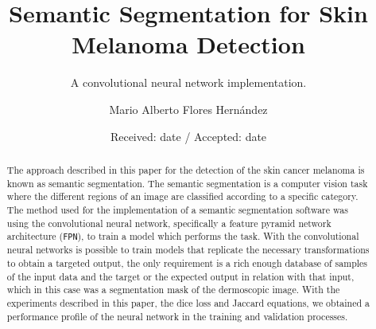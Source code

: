 %
%


\title{Semantic Segmentation for Skin Melanoma Detection%
}
\subtitle{A convolutional neural network implementation.}


\author{Mario Alberto Flores Hernández}


\date{Received: date / Accepted: date}


\maketitle

\begin{abstract}
  The approach described in this paper for the detection of the skin cancer melanoma is known as semantic segmentation. The semantic segmentation is a computer vision task where the different regions of an image are classified according to a specific category. The method used for the implementation of a semantic segmentation software was using the convolutional neural network, specifically a feature pyramid network architecture (\texttt{FPN}), to train a model which performs the task. With the convolutional neural networks is possible to train models that replicate the necessary transformations to obtain a targeted output, the only requirement is a rich enough database of samples of the input data and the target or the expected output in relation with that input, which in this case was a segmentation mask of the dermoscopic image. With the experiments described in this paper, the dice loss and Jaccard equations, we obtained a performance profile of the neural network in the training and validation processes.

\end{abstract}

